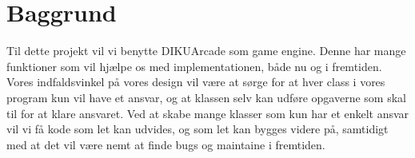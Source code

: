 \section{Baggrund}
Til dette projekt vil vi benytte DIKUArcade som game engine. Denne har mange funktioner som vil hjælpe os med implementationen, både nu og i fremtiden. Vores indfaldsvinkel på vores design vil være at sørge for at hver class i vores program kun vil have et ansvar, og at klassen selv kan udføre opgaverne som skal til for at klare ansvaret. Ved at skabe mange klasser som kun har et enkelt ansvar vil vi få kode som let kan udvides, og som let kan bygges videre på, samtidigt med at det vil være nemt at finde bugs og maintaine i fremtiden. 
